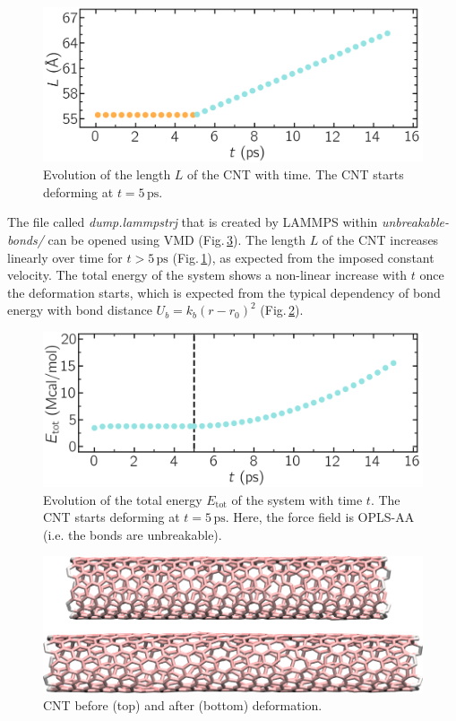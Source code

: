 \documentclass[9pt,tutorial]{livecoms}
\begin{document}
\begin{figure}
\centering
\includegraphics[width=\linewidth]{CNT-lenght-unbreakable}
\caption{Evolution of the length $L$ of the CNT with time. The CNT starts deforming at $t = 5\,\text{ps}$.}
\label{fig:CNT-unbreakable-lenght}
\end{figure}

The file called \textit{dump.lammpstrj} that is created by LAMMPS within \textit{unbreakable-bonds/} can be opened using VMD (Fig.\,\ref{fig:CNT-deformed-unbreakable}). The length $L$ of the CNT increases linearly over time for $t > 5\,\text{ps}$ (Fig.\,\ref{fig:CNT-unbreakable-lenght}), as expected from the imposed constant velocity. The total energy of the system shows a non-linear increase with $t$ once the deformation starts, which is expected from the typical dependency of bond energy with bond distance $U_b = k_b \left( r - r_0 \right)^2$ (Fig.\,\ref{fig:CNT-unbreakable-energy}).

\begin{figure}
\centering
\includegraphics[width=\linewidth]{CNT-energy-unbreakable}
\caption{Evolution of the total energy $E_\text{tot}$ of the system with time $t$. The CNT starts deforming at $t = 5\,\text{ps}$. Here, the force field is OPLS-AA (i.e. the bonds are unbreakable).}
\label{fig:CNT-unbreakable-energy}
\end{figure}

\begin{figure}
\centering
\includegraphics[width=\linewidth]{CNT-deformed-unbreakable}
\caption{CNT before (top) and after (bottom) deformation.}
\label{fig:CNT-deformed-unbreakable}
\end{figure}
\end{document}
